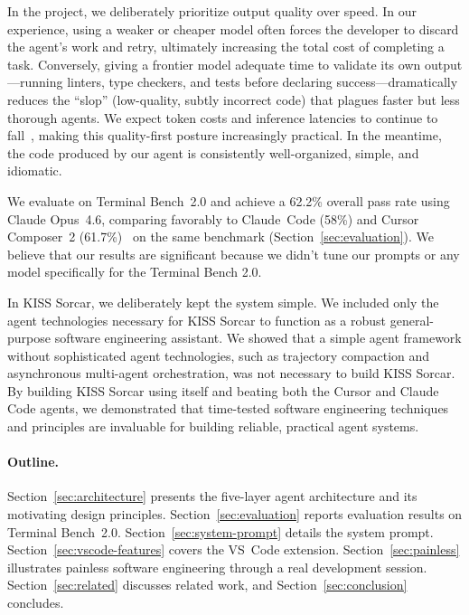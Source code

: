 \documentclass{article}
\begin{document}
In the project, we deliberately prioritize output quality over speed.  In our experience, using a weaker or cheaper model often forces the developer to discard the agent's work and retry, ultimately increasing the total cost of completing a task.  Conversely, giving a frontier model adequate time to validate its own output---running linters, type checkers, and tests before declaring success---dramatically reduces the ``slop'' (low-quality, subtly incorrect code) that plagues faster but less thorough agents.  We expect token costs and inference latencies to continue to fall~\citep {gao2025trae}, making this quality-first posture increasingly practical.  In the meantime, the code produced by our agent is consistently well-organized, simple, and idiomatic.

We evaluate on Terminal Bench~2.0 and achieve a 62.2\% overall pass rate using Claude Opus~4.6, comparing favorably to Claude~Code (58\%) and Cursor Composer~2 (61.7\%)~\citep{cursor2026composer2} on the same benchmark (Section~\ref{sec:evaluation}).  We believe that our results are significant because we didn't tune our prompts or any model specifically for the Terminal Bench 2.0.

In KISS Sorcar, we deliberately kept the system simple.  We included only the agent technologies necessary for KISS Sorcar to function as a robust general-purpose software engineering assistant. We showed that a simple agent framework without sophisticated agent technologies, such as trajectory compaction and asynchronous multi-agent orchestration, was not necessary to build KISS Sorcar.  By building KISS Sorcar using itself and beating both the Cursor and Claude Code agents, we demonstrated that time-tested software engineering techniques and principles are invaluable for building reliable, practical agent systems.

\paragraph{Outline.}
Section~\ref{sec:architecture} presents the five-layer agent architecture and its motivating design principles. Section~\ref{sec:evaluation} reports evaluation results on Terminal Bench~2.0.  Section~\ref{sec:system-prompt} details the system prompt. Section~\ref{sec:vscode-features} covers the VS~Code extension. Section~\ref{sec:painless} illustrates painless software engineering through a real development session. Section~\ref{sec:related} discusses related work, and Section~\ref{sec:conclusion} concludes.
\end{document}
